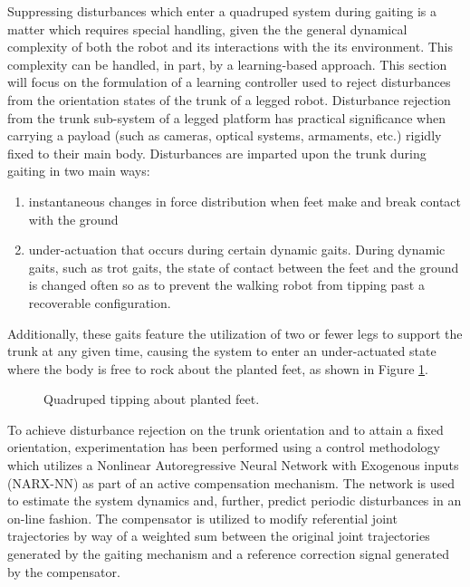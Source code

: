 		Suppressing disturbances which enter a quadruped system during gaiting is a matter which requires special handling, given the the general dynamical complexity of both the robot and its interactions with the its environment. This complexity can be handled, in part, by a learning-based approach. This section will focus on the formulation of a learning controller used to reject disturbances from the orientation states of the trunk of a legged robot. Disturbance rejection from the trunk sub-system of a legged platform has practical significance when carrying a payload (such as cameras, optical systems, armaments, etc.) rigidly fixed to their main body. Disturbances are imparted upon the trunk during gaiting in two main ways: 
		\begin{enumerate}
			\item instantaneous changes in force distribution when feet make and break contact with the ground 
			\item under-actuation that occurs during certain dynamic gaits. During dynamic gaits, such as trot gaits, the state of contact between the feet and the ground is changed often so as to prevent the walking robot from tipping past a recoverable configuration. 
			\end{enumerate}
		Additionally, these gaits feature the utilization of two or fewer legs to support the trunk at any given time, causing the system to enter an under-actuated state where the body is free to rock about the planted feet, as shown in Figure \ref{fig::quadruped_walking}.
			\begin{figure}[!h]
			\centering
				\caption{Quadruped tipping about planted feet. }
				\label{fig::quadruped_walking}
			\end{figure}
		To achieve disturbance rejection on the trunk orientation and to attain a fixed orientation, experimentation has been performed using a control methodology which utilizes a Nonlinear Autoregressive Neural Network with Exogenous inputs (NARX-NN) as part of an active compensation mechanism. The network is used to estimate the system dynamics and, further, predict periodic disturbances in an on-line fashion. The compensator is utilized to modify referential joint trajectories by way of a weighted sum between the original joint trajectories generated by the gaiting mechanism and a reference correction signal generated by the compensator.

